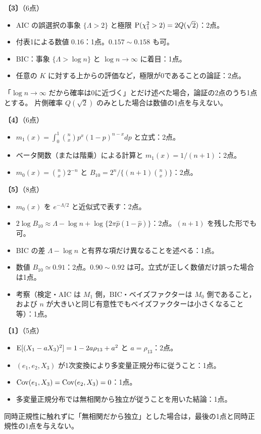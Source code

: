 \documentclass[a4paper,11pt]{ltjsarticle}
\renewcommand{\ans}[1]{\par\medskip\noindent\textbf{〔#1〕}\quad}
\renewcommand{\points}[1]{\hfill\textnormal{（#1点）}\par\nobreak}
\begin{document}
\ans{3}\points{6}
\begin{itemize}
\item AIC の誤選択の事象 $\{\Lambda>2\}$ と極限 $\operatorname{P}(\chi^2_1>2)=2Q(\sqrt2)$：2点。
\item 付表1による数値 $0.16$：1点。$0.157\sim0.158$ も可。
\item BIC：事象 $\{\Lambda>\log n\}$ と $\log n\to\infty$ に着目：1点。
\item 任意の $K$ に対する上からの評価など，極限が0であることの論証：2点。
\end{itemize}
「$\log n\to\infty$ だから確率は0に近づく」とだけ述べた場合，論証の2点のうち1点とする。
片側確率 $Q(\sqrt2)$ のみとした場合は数値の1点を与えない。

\ans{4}\points{6}
\begin{itemize}
\item $m_1(x)=\int_0^1\binom nxp^x(1-p)^{n-x}dp$ と立式：2点。
\item ベータ関数（または階乗）による計算と $m_1(x)=1/(n+1)$：2点。
\item $m_0(x)=\binom nx2^{-n}$ と $B_{10}=2^n/\{(n+1)\binom nx\}$：2点。
\end{itemize}

\ans{5}\points{8}
\begin{itemize}
\item $m_0(x)$ を $e^{-\Lambda/2}$ と近似式で表す：2点。
\item $2\log B_{10}\approx\Lambda-\log n+\log\{2\pi\hat p(1-\hat p)\}$：2点。$(n+1)$ を残した形でも可。
\item BIC の差 $\Lambda-\log n$ と有界な項だけ異なることを述べる：1点。
\item 数値 $B_{10}\simeq0.91$：2点。$0.90\sim0.92$ は可。立式が正しく数値だけ誤った場合は1点。
\item 考察（検定・AIC は $M_1$ 側，BIC・ベイズファクターは $M_0$ 側であること，および $n$ が大きいと同じ有意性でもベイズファクターは小さくなること等）：1点。
\end{itemize}
\newpage

\ans{1}\points{5}
\begin{itemize}
\item $\operatorname{E}[(X_1-aX_3)^2]=1-2a\rho_{13}+a^2$ と $a=\rho_{13}$：2点。
\item $(e_1,e_2,X_3)$ が1次変換により多変量正規分布に従うこと：1点。
\item $\operatorname{Cov}(e_1,X_3)=\operatorname{Cov}(e_2,X_3)=0$：1点。
\item 多変量正規分布では無相関から独立が従うことを用いた結論：1点。
\end{itemize}
同時正規性に触れずに「無相関だから独立」とした場合は，最後の1点と同時正規性の1点を与えない。
\end{document}
